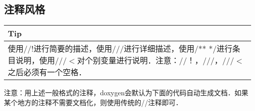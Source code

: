 \documentclass[a4paper,11pt,CJK]{article}
\begin{document}
\begin{CJK}{UTF8}{gbsn}
\subsection{注释风格}
\begin{table}[htbp]
\flushleft
\begin{tabular}{p{400pt}}
\toprule
\rowcolor[gray]{.8} Tip \\
\midrule
使用//!进行简要的描述，使用///进行详细描述，使用/** */进行条目说明，使用///$<$对个别变量进行说明．注意：//！，///，///$<$ 之后必须有一个空格．
\\
\bottomrule
\end{tabular}
\end{table}
\indent 注意：用上述一般格式的注释，doxygen会默认为下面的代码自动生成文档．如果某个地方的注释不需要文档化，则使用传统的//注释即可．\\
\\
\\
\\
\\


\end{CJK}
\end{document}
